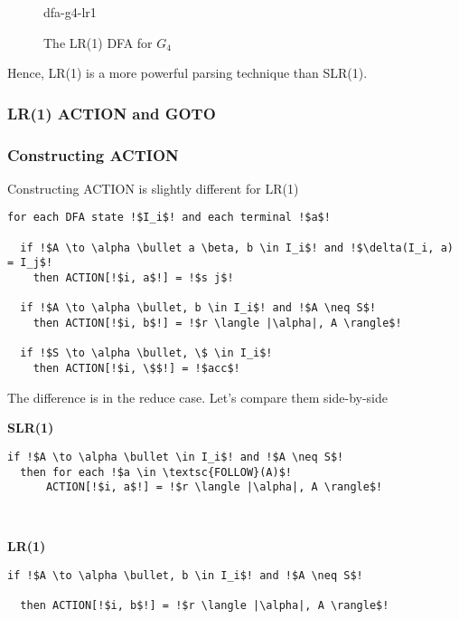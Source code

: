 \begin{figure}
    \centering
    {dfa-g4-lr1}
    \caption{The LR(1) DFA for $G_4$}
    \label{fig:dfa-g4-lr1}
\end{figure}

Hence, LR(1) is a more powerful parsing technique than SLR(1).

\subsubsection{LR(1) ACTION and GOTO}

\subsubsection{Constructing ACTION}
Constructing ACTION is slightly different for LR(1)

\begin{code}
\begin{lstlisting}[style=pseudocode]
for each DFA state !$I_i$! and each terminal !$a$!

  if !$A \to \alpha \bullet a \beta, b \in I_i$! and !$\delta(I_i, a) = I_j$! 
    then ACTION[!$i, a$!] = !$s j$!
    
  if !$A \to \alpha \bullet, b \in I_i$! and !$A \neq S$! 
    then ACTION[!$i, b$!] = !$r \langle |\alpha|, A \rangle$!
      
  if !$S \to \alpha \bullet, \$ \in I_i$! 
    then ACTION[!$i, \$$!] = !$acc$!
\end{lstlisting}
\vspace{1mm}
\end{code}

The difference is in the reduce case. Let's compare them side-by-side

\begin{minipage}[t]{0.49\textwidth}
\textbf{SLR(1)}
\begin{lstlisting}[style=pseudocode]
if !$A \to \alpha \bullet \in I_i$! and !$A \neq S$! 
  then for each !$a \in \textsc{FOLLOW}(A)$!
      ACTION[!$i, a$!] = !$r \langle |\alpha|, A \rangle$!
\end{lstlisting}
\end{minipage}%
\begin{minipage}[t]{0.02\textwidth}
\textcolor{white}{1}
\end{minipage}%
\begin{minipage}[t]{0.49\textwidth}
\textbf{LR(1)}
 \begin{lstlisting}[style=pseudocode]
if !$A \to \alpha \bullet, b \in I_i$! and !$A \neq S$! 
  
  then ACTION[!$i, b$!] = !$r \langle |\alpha|, A \rangle$!
\end{lstlisting}
\end{minipage}

